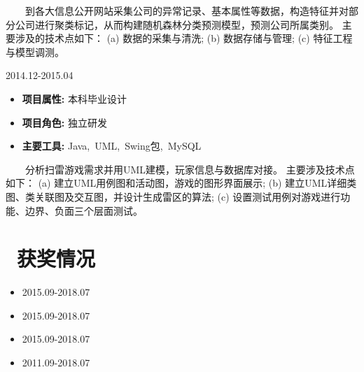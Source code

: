 \documentclass{resume}
\begin{document}
{\ \ \ \ 到各大信息公开网站采集公司的异常记录、基本属性等数据，构造特征并对部分公司进行聚类标记，从而构建随机森林分类预测模型，预测公司所属类别。
主要涉及的技术点如下：
(a) 数据的采集与清洗;
(b) 数据存储与管理;
(c) 特征工程与模型调测。
  
\medskip





                       {2014.12-2015.04}

\begin{itemize} [parsep=0.5ex]

\item  \textbf{ 项目属性: }      {本科毕业设计}
\item   \textbf{ 项目角色: }        {独立研发}
\item    \textbf{ 主要工具: }       {Java,\ UML,\ Swing包,\ MySQL}

\end{itemize}


{\ \ \ \ 分析扫雷游戏需求并用UML建模，玩家信息与数据库对接。
主要涉及技术点如下：
(a) 建立UML用例图和活动图，游戏的图形界面展示;
(b) 建立UML详细类图、类关联图及交互图，并设计生成雷区的算法;
(c) 设置测试用例对游戏进行功能、边界、负面三个层面测试。 }
  
\medskip










\section{   \faTrophy   \ 获奖情况}


\begin{itemize} [parsep=0.5ex]

\item   {}                                                   {2015.09-2018.07}
\item   {}                                           {2015.09-2018.07}
\item   {}                                    {2015.09-2018.07}

\item   {}                                  {2011.09-2018.07}


\end{itemize}}
\end{document}
